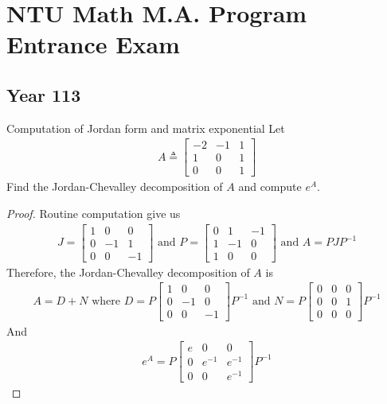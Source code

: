 \documentclass{report}
\begin{document}
\chapter{NTU Math M.A. Program Entrance Exam} 
\section{Year 113}
\begin{question}{Computation of Jordan form and matrix exponential}{}
Let 
\begin{align*}
A\triangleq  \begin{bmatrix}
  -2 & -1 & 1\\
  1 & 0 & 1\\
  0 & 0 & 1
\end{bmatrix}
\end{align*}
Find the Jordan-Chevalley decomposition of $A$ and compute  $e^A$. 
\end{question}
\begin{proof}
Routine computation give us 
\begin{align*}
J=\begin{bmatrix}
  1 & 0 & 0 \\
  0 & -1 & 1\\
  0 & 0 & -1
\end{bmatrix}\text{ and }P=\begin{bmatrix}
  0 & 1 & -1 \\
  1 & -1 & 0 \\
  1 & 0 & 0
\end{bmatrix}\text{ and }A=PJP^{-1}
\end{align*}
Therefore, the Jordan-Chevalley decomposition of $A$ is 
\begin{align*}
A= D+ N \text{ where }D=P\begin{bmatrix}
  1 & 0 & 0 \\
  0 & -1 & 0 \\
  0 & 0 & -1 
\end{bmatrix}P^{-1}\text{ and }N=P\begin{bmatrix}
0 & 0 & 0 \\
0 & 0 & 1 \\
0 & 0 & 0
\end{bmatrix}P ^{-1}
\end{align*}
And 
\begin{align*}
e^A= P\begin{bmatrix}
  e & 0 & 0\\
  0 & e^{-1} & e^{-1} \\
  0 & 0 & e^{-1}
\end{bmatrix} P^{-1}
\end{align*}
\end{proof}
\end{document}
